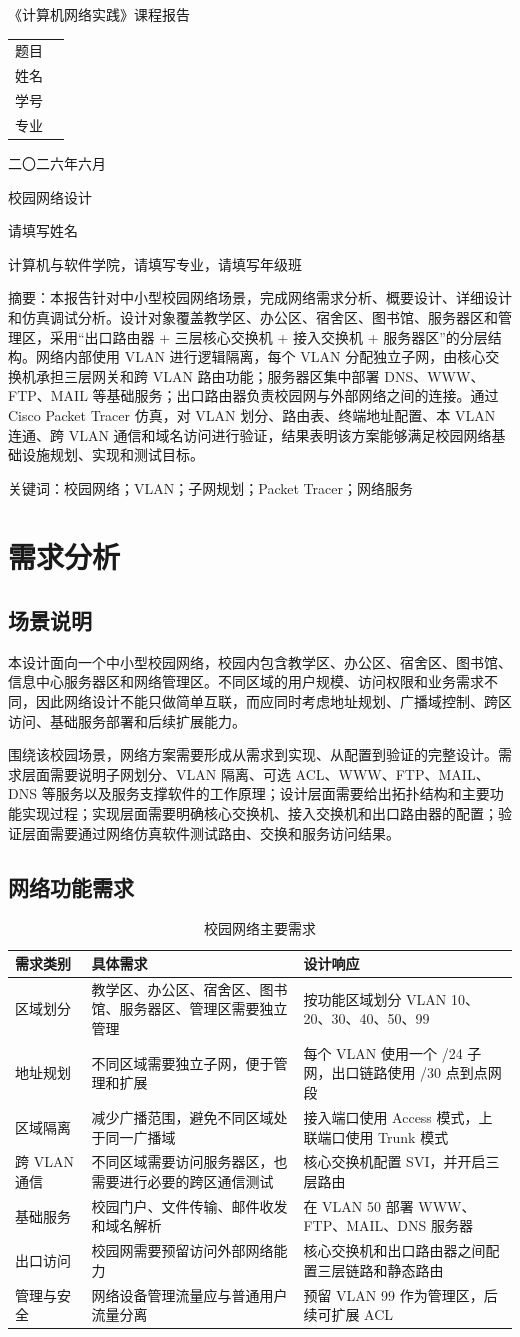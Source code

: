 \documentclass[UTF8,a4paper]{ctexart}
\newcommand{\ReportTitle}{校园网络设计}
\newcommand{\ReportAuthor}{请填写姓名}
\newcommand{\ReportCollege}{计算机与软件学院}
\newcommand{\ReportMajor}{请填写专业}
\newcommand{\ReportClass}{请填写年级班}
\newcommand{\ReportAbstract}{本报告针对中小型校园网络场景，完成网络需求分析、概要设计、详细设计和仿真调试分析。设计对象覆盖教学区、办公区、宿舍区、图书馆、服务器区和管理区，采用“出口路由器 + 三层核心交换机 + 接入交换机 + 服务器区”的分层结构。网络内部使用 VLAN 进行逻辑隔离，每个 VLAN 分配独立子网，由核心交换机承担三层网关和跨 VLAN 路由功能；服务器区集中部署 DNS、WWW、FTP、MAIL 等基础服务；出口路由器负责校园网与外部网络之间的连接。通过 Cisco Packet Tracer 仿真，对 VLAN 划分、路由表、终端地址配置、本 VLAN 连通、跨 VLAN 通信和域名访问进行验证，结果表明该方案能够满足校园网络基础设施规划、实现和测试目标。}
\newcommand{\ReportKeywords}{校园网络；VLAN；子网规划；Packet Tracer；网络服务}
\newcommand{\MakeCourseCover}{
  \begin{titlepage}
    \centering
    \vspace*{2.5cm}
    {\heiti\zihao{2}《计算机网络实践》课程报告\par}
    \vspace{2.5cm}
    {\songti\zihao{3}
    \begin{tabular}{rl}
      题目 & \underline{\makebox[8cm][c]{校园网络设计}} \\[1.0cm]
      姓名 & \underline{\makebox[8cm][c]{请填写姓名}} \\[1.0cm]
      学号 & \underline{\makebox[8cm][c]{请填写学号}} \\[1.0cm]
      专业 & \underline{\makebox[8cm][c]{请填写专业}} \\
    \end{tabular}
    \par}
    \vfill
    {\songti\zihao{4}二〇二六年六月\par}
  \end{titlepage}
}
\newcommand{\MakeReportHeader}{
  \begin{center}
    {\heiti\zihao{3}\ReportTitle\par}
    \vspace{\baselineskip}
    {\songti\zihao{5}\ReportAuthor\par}
    {\songti\zihao{-5}\ReportCollege，\ReportMajor，\ReportClass\par}
  \end{center}
  \vspace{\baselineskip}
  {\noindent\fangsong\zihao{-5}摘\quad 要：\ReportAbstract\par}
  \vspace{0.5\baselineskip}
  {\noindent\songti\zihao{-5}关键词：\ReportKeywords\par}
  \vspace{\baselineskip}
}
\begin{document}
\MakeCourseCover
\MakeReportHeader

\section{需求分析}

\subsection{场景说明}

本设计面向一个中小型校园网络，校园内包含教学区、办公区、宿舍区、图书馆、信息中心服务器区和网络管理区。不同区域的用户规模、访问权限和业务需求不同，因此网络设计不能只做简单互联，而应同时考虑地址规划、广播域控制、跨区访问、基础服务部署和后续扩展能力。

围绕该校园场景，网络方案需要形成从需求到实现、从配置到验证的完整设计。需求层面需要说明子网划分、VLAN 隔离、可选 ACL、WWW、FTP、MAIL、DNS 等服务以及服务支撑软件的工作原理；设计层面需要给出拓扑结构和主要功能实现过程；实现层面需要明确核心交换机、接入交换机和出口路由器的配置；验证层面需要通过网络仿真软件测试路由、交换和服务访问结果。

\subsection{网络功能需求}

\begin{table}[H]
\centering
\caption{校园网络主要需求}
\begin{tabularx}{\textwidth}{p{2.2cm}YY}
\toprule
需求类别 & 具体需求 & 设计响应 \\
\midrule
区域划分 & 教学区、办公区、宿舍区、图书馆、服务器区、管理区需要独立管理 & 按功能区域划分 VLAN 10、20、30、40、50、99 \\
地址规划 & 不同区域需要独立子网，便于管理和扩展 & 每个 VLAN 使用一个 /24 子网，出口链路使用 /30 点到点网段 \\
区域隔离 & 减少广播范围，避免不同区域处于同一广播域 & 接入端口使用 Access 模式，上联端口使用 Trunk 模式 \\
跨 VLAN 通信 & 不同区域需要访问服务器区，也需要进行必要的跨区通信测试 & 核心交换机配置 SVI，并开启三层路由 \\
基础服务 & 校园门户、文件传输、邮件收发和域名解析 & 在 VLAN 50 部署 WWW、FTP、MAIL、DNS 服务器 \\
出口访问 & 校园网需要预留访问外部网络能力 & 核心交换机和出口路由器之间配置三层链路和静态路由 \\
管理与安全 & 网络设备管理流量应与普通用户流量分离 & 预留 VLAN 99 作为管理区，后续可扩展 ACL \\
\bottomrule
\end{tabularx}
\end{table}
\end{document}
